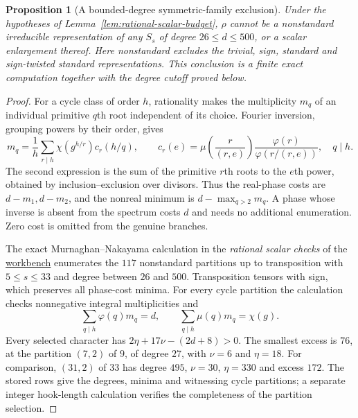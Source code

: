 \documentclass[11pt]{article}
\newtheorem{proposition}[theorem]{Proposition}
\theoremstyle{definition}
\theoremstyle{remark}
\newcommand{\workbenchurl}{https://github.com/KokunoYumeto/algebraic-cycles-and-motives-workbench}
\begin{document}
\begin{proposition}[A bounded-degree symmetric-family exclusion]
\label{prop:symmetric-scalar-exclusion}
Under the hypotheses of Lemma~\ref{lem:rational-scalar-budget},
$\rho$ cannot be a nonstandard irreducible representation of any
$S_s$ of degree $26\le d\le500$, or a scalar enlargement thereof.
Here nonstandard excludes the trivial, sign, standard and
sign-twisted standard representations.  This conclusion is a finite
exact computation together with the degree cutoff proved below.
\end{proposition}
\begin{proof}
For a cycle class of order $h$, rationality makes the multiplicity
$m_q$ of an individual primitive $q$th root independent of its choice.
Fourier inversion, grouping powers by their order, gives
\[
 m_q=\frac1h\sum_{r\mid h}\chi(g^{h/r})c_r(h/q),\qquad
 c_r(e)=\mu\left(\frac r{(r,e)}\right)
       \frac{\varphi(r)}{\varphi(r/(r,e))},\quad q\mid h.
\]
The second expression is the sum of the primitive $r$th roots to
the $e$th power, obtained by inclusion--exclusion over divisors.
Thus the real-phase costs are $d-m_1,d-m_2$, and the nonreal
minimum is $d-\max_{q>2}m_q$.  A phase whose inverse is absent
from the spectrum costs $d$ and needs no additional enumeration.
Zero cost is omitted from the genuine branches.

The exact Murnaghan--Nakayama calculation in the
\emph{rational scalar checks} of the
\href{\workbenchurl}{workbench} enumerates the $117$ nonstandard
partitions up to transposition with $5\le s\le33$ and degree
between $26$ and $500$.  Transposition tensors with sign, which
preserves all phase-cost minima.  For every cycle partition the
calculation checks nonnegative integral multiplicities and
\[
 \sum_{q\mid h}\varphi(q)m_q=d,\qquad
 \sum_{q\mid h}\mu(q)m_q=\chi(g).
\]
Every selected character has
$2\eta+17\nu-(2d+8)>0$.  The smallest excess is $76$,
at the partition $(7,2)$ of $9$, of degree $27$, with
$\nu=6$ and $\eta=18$.  For comparison, $(31,2)$ of $33$
has degree $495$, $\nu=30$, $\eta=330$ and excess $172$.
The stored rows give the degrees, minima and witnessing cycle
partitions; a separate integer hook-length calculation verifies
the completeness of the partition selection.


\end{proof}
\end{document}

